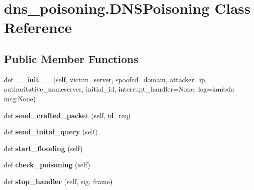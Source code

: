 \hypertarget{classdns__poisoning_1_1DNSPoisoning}{}\section{dns\+\_\+poisoning.\+D\+N\+S\+Poisoning Class Reference}
\label{classdns__poisoning_1_1DNSPoisoning}
\subsection*{Public Member Functions}
\begin{DoxyCompactItemize}
\item 
\mbox{\label{classdns__poisoning_1_1DNSPoisoning_a2aefb588dff724bbb239fb54e2c6ca19}} 
def {\bfseries \+\_\+\+\_\+init\+\_\+\+\_\+} (self, victim\+\_\+server, spoofed\+\_\+domain, attacker\+\_\+ip, authoritative\+\_\+nameserver, initial\+\_\+id, interrupt\+\_\+handler=None, log=lambda msg\+:\+None)
\item 
\mbox{\label{classdns__poisoning_1_1DNSPoisoning_a7208959663e75447b0221fc7fab129e7}} 
def {\bfseries send\+\_\+crafted\+\_\+packet} (self, id\+\_\+req)
\item 
\mbox{\label{classdns__poisoning_1_1DNSPoisoning_a0c8ff9306f38db988648645b93f399d1}} 
def {\bfseries send\+\_\+inital\+\_\+query} (self)
\item 
\mbox{\label{classdns__poisoning_1_1DNSPoisoning_a1154be89dbdf8a2769a2ca1d3635f363}} 
def {\bfseries start\+\_\+flooding} (self)
\item 
\mbox{\label{classdns__poisoning_1_1DNSPoisoning_aa59092cd2bd23620644af9814f782888}} 
def {\bfseries check\+\_\+poisoning} (self)
\item 
\mbox{\label{classdns__poisoning_1_1DNSPoisoning_a65f1f3e1f022f64ca35c73b80b6ccbfe}} 
def {\bfseries stop\+\_\+handler} (self, sig, frame)
\end{DoxyCompactItemize}
